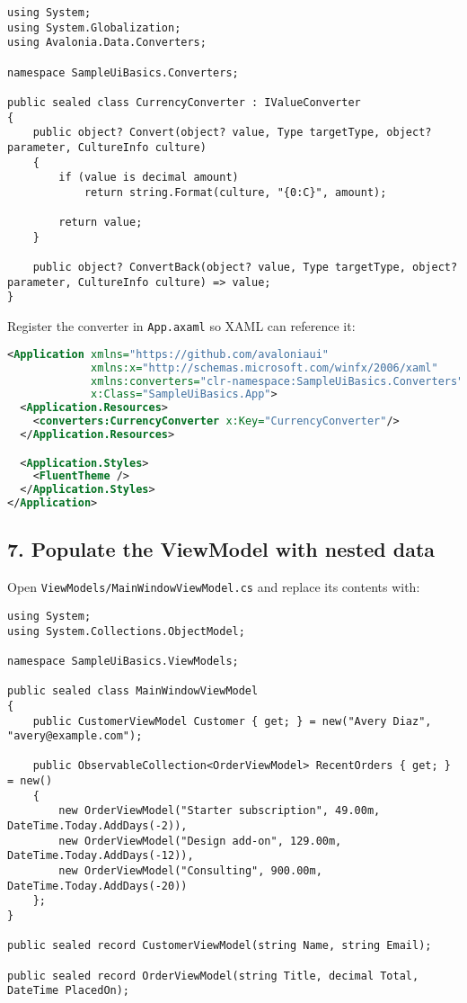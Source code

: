 \begin{lstlisting}
using System;
using System.Globalization;
using Avalonia.Data.Converters;

namespace SampleUiBasics.Converters;

public sealed class CurrencyConverter : IValueConverter
{
    public object? Convert(object? value, Type targetType, object? parameter, CultureInfo culture)
    {
        if (value is decimal amount)
            return string.Format(culture, "{0:C}", amount);

        return value;
    }

    public object? ConvertBack(object? value, Type targetType, object? parameter, CultureInfo culture) => value;
}
\end{lstlisting}

Register the converter in \passthrough{\lstinline!App.axaml!} so XAML
can reference it:

\begin{lstlisting}[language=XML]
<Application xmlns="https://github.com/avaloniaui"
             xmlns:x="http://schemas.microsoft.com/winfx/2006/xaml"
             xmlns:converters="clr-namespace:SampleUiBasics.Converters"
             x:Class="SampleUiBasics.App">
  <Application.Resources>
    <converters:CurrencyConverter x:Key="CurrencyConverter"/>
  </Application.Resources>

  <Application.Styles>
    <FluentTheme />
  </Application.Styles>
</Application>
\end{lstlisting}

\subsection{7. Populate the ViewModel with nested
data}\label{populate-the-viewmodel-with-nested-data}

Open \passthrough{\lstinline!ViewModels/MainWindowViewModel.cs!} and
replace its contents with:

\begin{lstlisting}
using System;
using System.Collections.ObjectModel;

namespace SampleUiBasics.ViewModels;

public sealed class MainWindowViewModel
{
    public CustomerViewModel Customer { get; } = new("Avery Diaz", "avery@example.com");

    public ObservableCollection<OrderViewModel> RecentOrders { get; } = new()
    {
        new OrderViewModel("Starter subscription", 49.00m, DateTime.Today.AddDays(-2)),
        new OrderViewModel("Design add-on", 129.00m, DateTime.Today.AddDays(-12)),
        new OrderViewModel("Consulting", 900.00m, DateTime.Today.AddDays(-20))
    };
}

public sealed record CustomerViewModel(string Name, string Email);

public sealed record OrderViewModel(string Title, decimal Total, DateTime PlacedOn);
\end{lstlisting}

